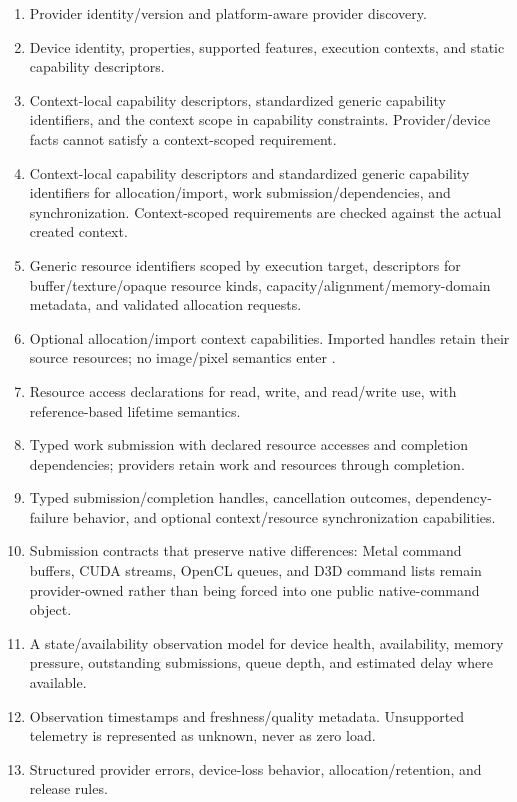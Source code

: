 \deliverables
\begin{enumerate}
  \item Provider identity/version and platform-aware provider discovery.
  \item Device identity, properties, supported features, execution contexts, and static capability descriptors.
  \item Context-local capability descriptors, standardized generic capability identifiers, and the context scope in capability constraints. Provider/device facts cannot satisfy a context-scoped requirement.
  \item Context-local capability descriptors and standardized generic capability identifiers for allocation/import, work submission/dependencies, and synchronization. Context-scoped requirements are checked against the actual created context.
  \item Generic resource identifiers scoped by execution target, descriptors for buffer/texture/opaque resource kinds, capacity/alignment/memory-domain metadata, and validated allocation requests.
  \item Optional allocation/import context capabilities. Imported handles retain their source resources; no image/pixel semantics enter \GEP{}.
  \item Resource access declarations for read, write, and read/write use, with reference-based lifetime semantics.
  \item Typed work submission with declared resource accesses and completion dependencies; providers retain work and resources through completion.
  \item Typed submission/completion handles, cancellation outcomes, dependency-failure behavior, and optional context/resource synchronization capabilities.
  \item Submission contracts that preserve native differences: Metal command buffers, CUDA streams, OpenCL queues, and D3D command lists remain provider-owned rather than being forced into one public native-command object.
  \item A state/availability observation model for device health, availability, memory pressure, outstanding submissions, queue depth, and estimated delay where available.
  \item Observation timestamps and freshness/quality metadata. Unsupported telemetry is represented as unknown, never as zero load.
  \item Structured provider errors, device-loss behavior, allocation/retention, and release rules.

\end{enumerate}
